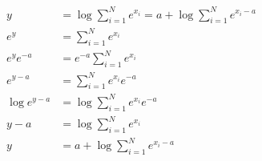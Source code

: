 

\newcommand{\ExerciseNumber}{09}

\newcommand{\PersonOne}{Marcel Bruckner (03674122)}
\newcommand{\PersonTwo}{Julian Hohenadel (03673879)}
\newcommand{\PersonThree}{Kevin Bein (03707775)}






%
%
%
\begin{flushleft}
\begin{align*}
y &= \log \sum_{i=1}^{N}e^{x_i} = a + \log \sum_{i=1}^{N}e^{x_i-a}\\
e^y &= \sum_{i=1}^{N}e^{x_i}\\
e^y e^{-a} &= e^{-a} \sum_{i=1}^{N}e^{x_i}\\
e^{y-a} &= \sum_{i=1}^{N}e^{x_i} e^{-a} \\
\log e^{y-a} &= \log \sum_{i=1}^{N}e^{x_i} e^{-a}\\
y-a &= \log \sum_{i=1}^{N}e^{x_i}\\
y &= a + \log \sum_{i=1}^{N}e^{x_i - a}\\
\end{align*}
\end{flushleft}
%
%
%
%
%
%
%
%





